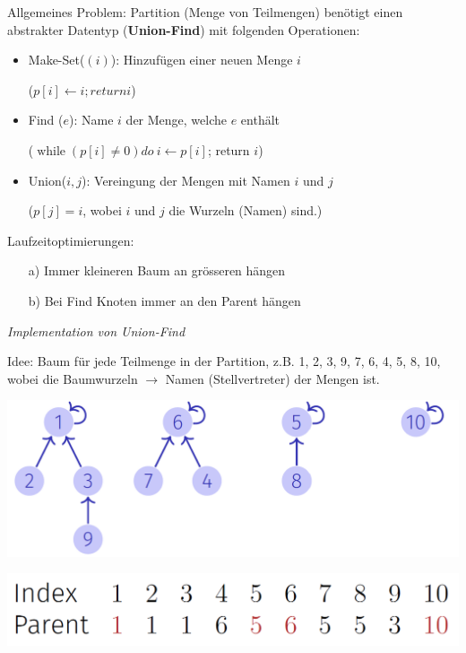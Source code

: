 \begin{sectionbox}
Allgemeines Problem: Partition (Menge von Teilmengen) benötigt einen abstrakter Datentyp (\textbf{Union-Find}) mit folgenden Operationen:\par
\begin{itemize}
    \item Make-Set($(i)$): Hinzufügen einer neuen Menge $i$\par($p[i] \leftarrow i; return i$)
    \item Find ($e$): Name $i$ der Menge, welche $e$ enthält \par($\operatorname{while} (p[i]\neq 0) do\ i \leftarrow p[i]$; return $i$)
    \item Union($i,j$): Vereingung der Mengen mit Namen $i$ und $j$ \par($p[j]=i$, wobei $i$ und $j$ die Wurzeln (Namen) sind.)
\end{itemize}\smallskip
Laufzeitoptimierungen:\par
\begin{itemize}
    \item[a)] Immer kleineren Baum an grösseren hängen
    \item[b)] Bei Find Knoten immer an den Parent hängen
\end{itemize}\par\smallskip

\textit{Implementation von Union-Find}\par
Idee: Baum für jede Teilmenge in der Partition, z.B. {{1, 2, 3, 9}, {7, 6, 4}, {5, 8}, {10}}, wobei die Baumwurzeln $\to$ Namen (Stellvertreter) der Mengen ist.\par\smallskip
\begin{center}
    \includegraphics[width = 0.7\columnwidth]{../img/UF.png}\par\smallskip
    \includegraphics[width = 0.7\columnwidth]{../img/UFarray.png}\par\smallskip
\end{center}


\end{sectionbox}
